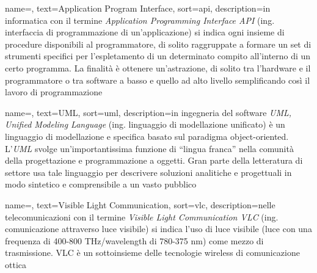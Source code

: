 








 {
    name=,
    text=Application Program Interface,
    sort=api,
    description={in informatica con il termine \emph{Application Programming Interface API} (ing. interfaccia di programmazione di un'applicazione) si indica ogni insieme di procedure disponibili al programmatore, di solito raggruppate a formare un set di strumenti specifici per l'espletamento di un determinato compito all'interno di un certo programma. La finalità è ottenere un'astrazione, di solito tra l'hardware e il programmatore o tra software a basso e quello ad alto livello semplificando così il lavoro di programmazione}
}

 {
    name=,
    text=UML,
    sort=uml,
    description={in ingegneria del software \emph{UML, Unified Modeling Language} (ing. linguaggio di modellazione unificato) è un linguaggio di modellazione e specifica basato sul paradigma object-oriented. L'\emph{UML} svolge un'importantissima funzione di ``lingua franca'' nella comunità della progettazione e programmazione a oggetti. Gran parte della letteratura di settore usa tale linguaggio per descrivere soluzioni analitiche e progettuali in modo sintetico e comprensibile a un vasto pubblico}
}

 {
    name=,
    text=Visible Light Communication,
    sort=vlc,
    description={nelle telecomunicazioni con il termine \emph{Visible Light Communication VLC} (ing. comunicazione attraverso luce visibile) si indica l'uso di luce visibile (luce con una frequenza di 400-800 THz/wavelength di 780-375 nm) come mezzo di trasmissione. VLC è un sottoinsieme delle tecnologie wireless di comunicazione ottica}
}

